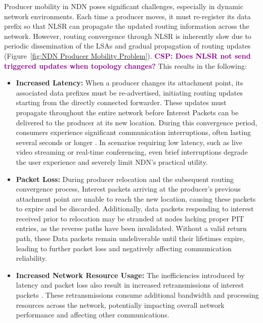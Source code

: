 \documentclass[10pt,conference]{IEEEtran}
\newcommand{\csp}[1]{\textbf{\textcolor{purple}{CSP: #1}}}
\begin{document}
Producer mobility in NDN poses significant challenges, especially in dynamic network environments. Each time a producer moves, it must re-register its data prefix so that NLSR can propagate the updated routing information across the network. However, routing convergence through NLSR is inherently slow due to periodic dissemination of the LSAs and gradual propagation of routing updates (Figure~\ref{fig:NDN Producer Mobility Problem}). \csp{Does NLSR not send triggered updates when topology changes?}
This results in the following:
\begin{itemize}
\item \textbf{Increased Latency:} When a producer changes its attachment point, its associated data prefixes must be re-advertised, initiating routing updates starting from the directly connected forwarder. These updates must propagate throughout the entire network before Interest Packets can be delivered to the producer at its new location. During this convergence period, consumers experience significant communication interruptions, often lasting several seconds or longer \cite{FIXME}. In scenarios requiring low latency, such as live video streaming or real-time conferencing, even brief interruptions degrade the user experience \cite{FIXME} and severely limit NDN's practical utility.

\item \textbf{Packet Loss:} During producer relocation and the subsequent routing convergence process, Interest packets arriving at the producer's previous attachment point are unable to reach the new location, causing these packets to expire and be discarded. Additionally, data packets responding to interest received prior to relocation may be stranded at nodes lacking proper PIT entries, as the reverse paths have been invalidated. Without a valid return path, these Data packets remain undeliverable until their lifetimes expire, leading to further packet loss and negatively affecting communication reliability.

\item \textbf{Increased Network Resource Usage:} The inefficiencies introduced by latency and packet loss also result in increased retransmissions of interest packets \cite{FIXME}. These retransmissions consume additional bandwidth and processing resources across the network, potentially impacting overall network performance and affecting other communications.

\end{itemize}
\end{document}
